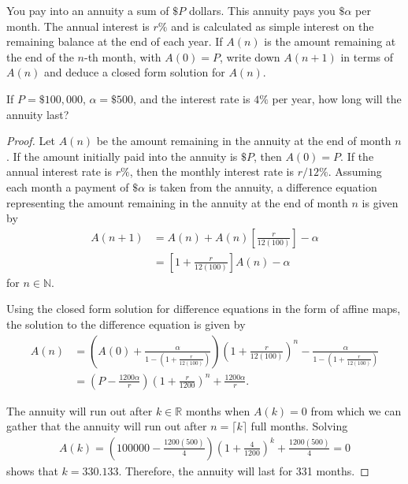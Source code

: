 \begin{problem}{1}
  You pay into an annuity a sum of $\$P$ dollars. This annuity
  pays you $\$\alpha$ per month. The annual interest is $r\%$ and is calculated
  as simple interest on the remaining balance at the end of each year. If $A(n)$
  is the amount remaining at the end of the $n$-th month, with $A(0) = P$,
  write down $A(n+1)$ in terms of $A(n)$ and deduce a closed form solution
  for $A(n)$.

  If $P = \$100,000$, $\alpha = \$500$, and the interest rate is $4\%$ per year,
  how long will the annuity last?
\end{problem}

\begin{proof}
  Let $A(n)$ be the amount remaining in the annuity at the end of month $n$. If the
  amount initially paid into the annuity is $\$P$, then $A(0) = P$. If the annual interest rate is $r\%$,
  then the monthly interest rate is $r/12 \%$. Assuming each month a payment of $\$\alpha$ is
  taken from the annuity, a difference equation representing the amount remaining in the annuity
  at the end of month $n$ is given by
  \begin{align*}
    A(n + 1) &= A(n) + A(n)\left[\frac{r}{12(100)}\right] - \alpha \\
    &= \left[1 + \frac{r}{12(100)}\right]A(n) - \alpha
  \end{align*}
  for $n\in\mathbb{N}$.

  Using the closed form solution for difference equations in the form of affine maps,
  the solution to the difference equation is given by
  \begin{align*}
    A(n) &= \left(A(0) + \frac{\alpha}{1 - \left(1 + \frac{r}{12(100)}\right)}\right) \left(1 + \frac{r}{12(100)}\right)^n - \frac{\alpha}{1 - \left(1 + \frac{r}{12(100)}\right)} \\
    &= \left(P - \frac{1200\alpha}{r}\right)\left(1 + \frac{r}{1200}\right)^n + \frac{1200\alpha}{r}.
  \end{align*}

  The annuity will run out after $k \in \mathbb{R}$ months when $A(k) = 0$ from which
  we can gather that the annuity will run out after $n = \lceil k \rceil$ full months.
  Solving
  \begin{align*}
    A(k) = \left(100000 - \frac{1200(500)}{4}\right)\left(1 + \frac{4}{1200}\right)^k + \frac{1200(500)}{4} =0
  \end{align*}
  shows that $k = 330.133$. Therefore,
  the annuity will last for 331 months.

\end{proof}
\newpage
